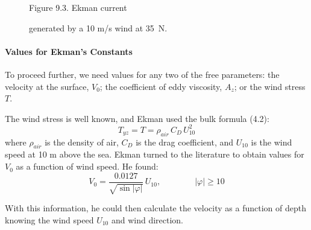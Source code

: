 \begin{figure}[h!]
\centering
\footnotesize
Figure 9.3. Ekman current \rule{0mm}{4ex}generated by a 10 m/s wind at
35\degrees\ N.

\label{fig:ekmancurrent}
\end{figure}

\paragraph{Values for Ekman's Constants}
To proceed further, we need
values for any two of the free parameters: the velocity at the
surface, $V_0$; the coefficient of eddy viscosity, $A_z$; or the wind
stress $T$.

The wind stress is well known, and
Ekman used the bulk formula (4.2):
\begin{equation}
T_{yz} = T = \rho_{air}\, C_D \,U_{10}^2
\end{equation}
where $\rho_{air}$ is the density of air, $C_D$ is the drag
coefficient, and $U_{10}$ is the wind speed at
10 m above the sea. Ekman turned to the literature to obtain values
for $V_0$ as a function of wind speed. He found:
\begin{equation}
V_0 = \frac{0.0127}{\sqrt{\sin|\varphi|}}\, U_{10}, \qquad \qquad
|\varphi|\ge 10
\end{equation}

With this information, he could then calculate the velocity as a
function of depth knowing the wind speed $U_{10}$ and wind direction.

